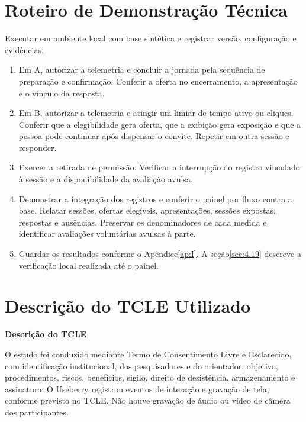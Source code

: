 \begin{apendicesenv}
\chapter{Roteiro de Demonstração Técnica}
\label{ap:D}

Executar em ambiente local com base sintética e registrar versão, configuração e evidências.

\begin{enumerate}
\def\labelenumi{\arabic{enumi}.}

\item
  Em A, autorizar a telemetria e concluir a jornada pela sequência de preparação e confirmação. Conferir a oferta no encerramento, a apresentação e o vínculo da resposta.
\item
  Em B, autorizar a telemetria e atingir um limiar de tempo ativo ou cliques. Conferir que a elegibilidade gera oferta, que a exibição gera exposição e que a pessoa pode continuar após dispensar o convite. Repetir em outra sessão e responder.
\item
  Exercer a retirada de permissão. Verificar a interrupção do registro vinculado à sessão e a disponibilidade da avaliação avulsa.
\item
  Demonstrar a integração dos registros e conferir o painel por fluxo contra a base. Relatar sessões, ofertas elegíveis, apresentações, sessões expostas, respostas e ausências. Preservar os denominadores de cada medida e identificar avaliações voluntárias avulsas à parte.
\item
  Guardar os resultados conforme o Apêndice\nobreakspace{}\ref{ap:I}. A seção\nobreakspace{}\ref{sec:4.19} descreve a verificação local realizada até o painel.
\end{enumerate}

\chapter{Descrição do TCLE Utilizado}
\label{ap:E}

\par\noindent\textbf{Descrição do TCLE}\par\nopagebreak

O estudo foi conduzido mediante Termo de Consentimento Livre e Esclarecido, com identificação institucional, dos pesquisadores e do orientador, objetivo, procedimentos, riscos, benefícios, sigilo, direito de desistência, armazenamento e assinatura. O Useberry registrou eventos de interação e gravação de tela, conforme previsto no TCLE. Não houve gravação de áudio ou vídeo de câmera dos participantes.


\end{apendicesenv}
